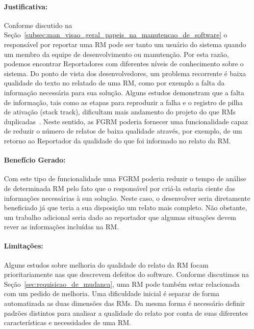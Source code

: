 
\paragraph{Justificativa:}
\label{par:justificativa_s01}

Conforme discutido na
Seção~\ref{subsec:man_visao_geral_papeis_na_manutencao_de_software} o
responsável por reportar uma RM pode ser tanto um usuário do sistema quando um
membro da equipe de desenvolvimento ou manutenção. Por esta razão, podemos
encontrar Reportadores com diferentes níveis de conhecimento sobre o sistema.
Do ponto de vista dos desenvolvedores, um problema recorrente é baixa qualidade
do texto no relatado de uma RM, como por exemplo a falta da informação
necessária para sua solução. Alguns estudos demonstram que a falta de
informação, tais como as etapas para reproduzir a falha e o registro de pilha de
ativação (stack track), dificultam mais andamento do projeto do que RMs
duplicadas~\cite{bettenburg2008makes, bettenburg2007quality}. Neste sentido, as
FGRM poderia fornecer uma funcionalidade capaz de reduzir o número de relatos de
baixa qualidade através, por exemplo, de um retorno ao Reportador da qualidade
do que foi informado no relato da RM\@.

\paragraph{Benefício Gerado:}
\label{par:beneficio_s01}

Com este tipo de funcionalidade uma FGRM poderia reduzir o tempo de análise de
determinada RM pelo fato que o responsável por criá-la estaria ciente das
informações necessárias à sua solução. Neste caso, o desenvolver seria
diretamente beneficiado já que teria a sua disposição um relato mais completo.
Não obstante, um trabalho adicional seria dado ao reportador que algumas
situações devem rever as informações incluídas na RM\@.

\paragraph{Limitações:}
\label{par:limitacoes_s01}

Alguns estudos sobre melhoria do qualidade do relato da RM focam
prioritariamente nas que descrevem defeitos do software. Conforme discutimos na
Seção~\ref{sec:requisicao_de_mudanca}, uma RM pode também estar relacionada com
um pedido de melhoria. Uma dificuldade inicial é separar de forma automatizada
as duas dimensões das RMs. Da mesma forma é necessário definir padrões distintos
para analisar a qualidade do relato por conta de suas diferentes características
e necessidades de uma RM\@.

